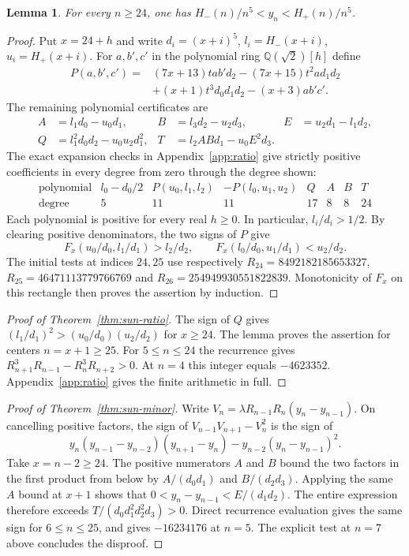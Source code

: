 \documentclass[11pt,a4paper]{article}
\newtheorem{lemma}[theorem]{Lemma}
\theoremstyle{definition}\newtheorem{problem}[theorem]{Problem}
\begin{document}
\begin{lemma}\label{lem:sun-tube}
For every $n\ge24$, one has
$H_-(n)/n^5<y_n<H_+(n)/n^5$.
\end{lemma}
\begin{proof}
Put $x=24+h$ and write $d_i=(x+i)^5$, $l_i=H_-(x+i)$,
$u_i=H_+(x+i)$. For $a,b',c'$ in the polynomial ring
$\mathbb{Q}(\sqrt2)[h]$ define
\begin{align*}
 P(a,b',c')={}&(7x+13)t ab'd_2-(7x+15)t^2 a d_1d_2\\
               &+(x+1)t^3d_0d_1d_2-(x+3)ab'c'.
\end{align*}
The remaining polynomial certificates are
\begin{align*}
 A&=l_1d_0-u_0d_1,& B&=l_3d_2-u_2d_3,& E&=u_2d_1-l_1d_2,\\
 Q&=l_1^2d_0d_2-u_0u_2d_1^2,&
 T&=l_2ABd_1-u_0 E^2d_3 .
\end{align*}
The exact expansion checks in Appendix~\ref{app:ratio} give strictly
positive coefficients in every degree from zero through the degree shown:
\[
\begin{array}{c|rrrrrrr}
 \text{polynomial}& l_0-d_0/2&P(u_0,l_1,l_2)&-P(l_0,u_1,u_2)& Q&A&B&T\\
 \hline
 \text{degree}&5&11&11&17&8&8&24
\end{array}
\]
Each polynomial is positive for every real $h\ge0$. In particular,
$l_i/d_i>1/2$. By clearing positive denominators, the two signs of $P$
give
\[
 F_x(u_0/d_0,l_1/d_1)>l_2/d_2,\qquad
 F_x(l_0/d_0,u_1/d_1)<u_2/d_2.
\]
The initial tests at indices $24,25$ use respectively
$R_{24}=8492182185653327$, $R_{25}=46471113779766769$ and
$R_{26}=254949930551822839$. Monotonicity of $F_x$ on this
rectangle then proves the assertion by induction.
\end{proof}

\begin{proof}[Proof of Theorem~\ref{thm:sun-ratio}]
The sign of $Q$ gives
$(l_1/d_1)^2>(u_0/d_0)(u_2/d_2)$ for $x\ge24$. The lemma proves the
assertion for centers $n=x+1\ge25$.
For $5\le n\le24$ the recurrence gives
$R_{n+1}^3R_{n-1}-R_n^3R_{n+2}>0$.
At $n=4$ this integer equals $-4623352$.
Appendix~\ref{app:ratio} gives the finite arithmetic in full.
\end{proof}
\begin{proof}[Proof of Theorem~\ref{thm:sun-minor}]
Write $V_n=\lambda R_{n-1}R_n(y_n-y_{n-1})$.
On cancelling positive factors, the sign of $V_{n-1}V_{n+1}-V_n^2$
is the sign of
\[
 y_n(y_{n-1}-y_{n-2})(y_{n+1}-y_n)
               -y_{n-2}(y_n-y_{n-1})^2 .
\]
Take $x=n-2\ge24$. The positive numerators $A$ and $B$ bound the two factors in the first product from below by
$A/(d_0d_1)$ and $B/(d_2d_3)$. Applying the same $A$ bound at
$x+1$ shows that $0<y_n-y_{n-1}<E/(d_1d_2)$.
The entire expression therefore exceeds
$T/(d_0d_1^2d_2^2d_3)>0$. Direct recurrence evaluation gives the
same sign for $6\le n\le25$, and gives $-16234176$ at $n=5$.
The explicit test at $n=7$ above concludes the disproof.
\end{proof}
\end{document}
